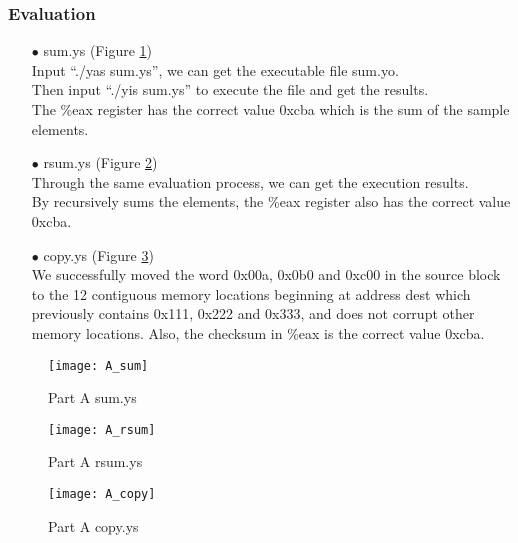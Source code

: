\documentclass{article}
\begin{document}
\subsubsection{Evaluation}

\begin{itemize}
\item[$\bullet$]{\ttfamily sum.ys} (Figure \ref{Part A: sum.ys})\\
Input “{\ttfamily ./yas sum.ys}”, we can get the executable file {\ttfamily sum.yo}. \\
Then input “{\ttfamily ./yis sum.ys}” to execute the file and get the results.\\
The {\ttfamily \%eax} register has the correct value {\ttfamily 0xcba} which is the sum of the sample elements.
\end{itemize}
\begin{itemize}
\item[$\bullet$]{\ttfamily rsum.ys} (Figure \ref{Part A: rsum.ys})\\
Through the same evaluation process, we can get the execution results. \\
By recursively sums the elements, the {\ttfamily \%eax} register also has the correct value {\ttfamily 0xcba}.
\end{itemize}
\begin{itemize}
\item[$\bullet$]{\ttfamily copy.ys} (Figure \ref{Part A: copy.ys})\\
We successfully moved the word {\ttfamily 0x00a}, {\ttfamily  0x0b0} and {\ttfamily 0xc00} in the source block to the 12 contiguous memory locations beginning at address dest which previously contains {\ttfamily 0x111}, {\ttfamily 0x222} and {\ttfamily 0x333}, and does not corrupt other memory locations. Also, the checksum in {\ttfamily \%eax} is the correct value {\ttfamily 0xcba}.
\end{itemize}
\begin{figure}[htbp]%
		\centering%
		\texttt{[image: A\_sum]}
		\caption{Part A  {\ttfamily sum.ys}} \label{Part A: sum.ys}%
\end{figure}
\begin{figure}[htbp]%
		\centering%
		\texttt{[image: A\_rsum]}
		\caption{Part A  {\ttfamily rsum.ys}} \label{Part A: rsum.ys}%
\end{figure}
\begin{figure}[htbp]%
		\centering%
		\texttt{[image: A\_copy]}
		\caption{Part A  {\ttfamily copy.ys}} \label{Part A: copy.ys}%
\end{figure}
\end{document}
